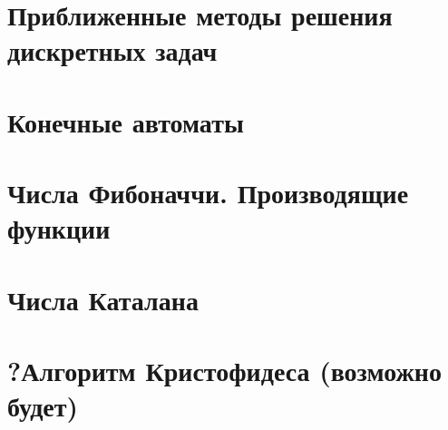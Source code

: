 \documentclass[12pt, fleqn]{article}
\begin{document}
  \section{Приближенные методы решения дискретных задач}


  \section{Конечные автоматы}


  \section{Числа Фибоначчи. Производящие функции}


  \section{Числа Каталана}


  \section{?Алгоритм Кристофидеса (возможно будет)}
\end{document}
